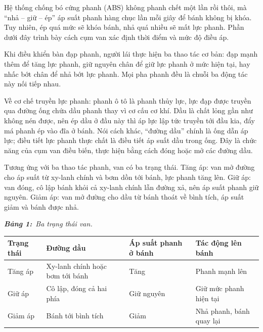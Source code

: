 \documentclass[12pt,a4paper,twoside]{article}
\newcommand{\tablecaption}[2]{%
    \par\vspace{2pt}%
    {\centering\textbf{\textit{Bảng #1:}}~\textit{#2}\par}%
    \vspace{0pt}%
}
\newenvironment{readingpassage}[1][]{%
    \begin{tcolorbox}[enhanced, colback=grayLight, colframe=secondaryBlue,
        coltitle=textDark, fonttitle=\bfseries, title={#1},
        rounded corners, arc=3mm, boxrule=1pt,
        left=15pt, right=15pt, top=10pt, bottom=10pt,
        breakable, before skip=10pt, after skip=10pt, drop fuzzy shadow]
    \setstretch{1.3}
}{\end{tcolorbox}}
\begin{document}
\begin{readingpassage}[]

Hệ thống chống bó cứng phanh (ABS) không phanh chết một lần rồi thôi, mà ``nhả -- giữ -- ép'' áp suất phanh hàng chục lần mỗi giây để bánh không bị khóa. Tuy nhiên, ép quá mức sẽ khóa bánh, nhả quá nhiều sẽ mất lực phanh. Phần dưới đây trình bày cách cụm van xác định thời điểm và mức độ điều áp.

Khi điều khiển bàn đạp phanh, người lái thực hiện ba thao tác cơ bản: đạp mạnh thêm để tăng lực phanh, giữ nguyên chân để giữ lực phanh ở mức hiện tại, hay nhấc bớt chân để nhả bớt lực phanh. Mọi pha phanh đều là chuỗi ba động tác này nối tiếp nhau.

Về cơ chế truyền lực phanh: phanh ô tô là phanh thủy lực, lực đạp được truyền qua đường ống chứa dầu phanh thay vì cơ cấu cơ khí. Dầu là chất lỏng gần như không nén được, nên ép dầu ở đầu này thì áp lực lập tức truyền tới đầu kia, đẩy má phanh ép vào đĩa ở bánh. Nói cách khác, ``đường dầu'' chính là ống dẫn áp lực; điều tiết lực phanh thực chất là điều tiết áp suất dầu trong ống. Đây là chức năng của cụm van điều biến, thực hiện bằng cách đóng hoặc mở các đường dầu.

Tương ứng với ba thao tác phanh, van có ba trạng thái. Tăng áp: van mở đường cho áp suất từ xy-lanh chính và bơm dồn tới bánh, lực phanh tăng lên. Giữ áp: van đóng, cô lập bánh khỏi cả xy-lanh chính lẫn đường xả, nên áp suất phanh giữ nguyên. Giảm áp: van mở đường cho dầu từ bánh thoát về bình tích, áp suất giảm và bánh được nhả.

\tablecaption{1}{Ba trạng thái van.}
\begin{center}
\renewcommand{\arraystretch}{1.3}
{\small
{}%
\begin{tabular}{|>{\centering\arraybackslash}m{2cm}|>{\raggedright\arraybackslash}m{4.5cm}|>{\centering\arraybackslash}m{3cm}|>{\raggedright\arraybackslash}m{4cm}|}
\hline
\rowcolor{primaryBlue!12}
\textbf{Trạng thái} & \textbf{Đường dầu} & \textbf{Áp suất phanh ở bánh} & \textbf{Tác động lên bánh} \\
\hline
Tăng áp & Xy-lanh chính hoặc bơm tới bánh & Tăng & Phanh mạnh lên \\
\hline
Giữ áp & Cô lập, đóng cả hai phía & Giữ nguyên & Giữ mức phanh hiện tại \\
\hline
Giảm áp & Bánh tới bình tích & Giảm & Nhả phanh, bánh quay lại \\
\hline
\end{tabular}
}
\end{center}


\end{readingpassage}
\end{document}
